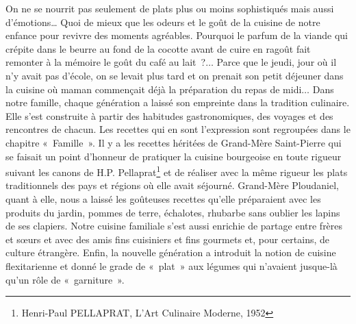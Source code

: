 On ne se nourrit pas seulement de plats plus ou moins sophistiqués mais aussi d'émotions… Quoi de mieux que les odeurs et le goût de la cuisine de notre enfance pour revivre des moments agréables. Pourquoi le parfum de la viande qui crépite dans le beurre au fond de la cocotte avant de cuire en ragoût fait remonter à la mémoire le goût du café au lait ?$\ldots$ Parce que le jeudi, jour où il n’y avait pas d’école, on se levait plus tard et on prenait son petit déjeuner dans la cuisine où maman commençait déjà la préparation du repas de midi$\ldots$
Dans notre famille, chaque génération a laissé son empreinte dans la tradition culinaire. Elle s’est construite à partir des habitudes gastronomiques, des voyages et des rencontres de chacun. Les recettes qui en sont l’expression sont regroupées dans le chapitre « Famille ». Il y a les recettes héritées de Grand-Mère Saint-Pierre qui se faisait un point d’honneur de pratiquer la cuisine bourgeoise en toute rigueur suivant les canons de H.P. Pellaprat\footnote{Henri-Paul PELLAPRAT, L’Art Culinaire Moderne, 1952} et de réaliser avec la même rigueur les plats traditionnels des pays et régions où elle avait séjourné. Grand-Mère Ploudaniel, quant à elle, nous a laissé les goûteuses recettes qu’elle préparaient avec les produits du jardin, pommes de terre, échalotes, rhubarbe sans oublier les lapins de ses clapiers. Notre cuisine familiale s’est aussi enrichie de partage entre frères et sœurs et avec des amis fins cuisiniers et fins gourmets et, pour certains, de culture étrangère. Enfin, la nouvelle génération a introduit la notion de cuisine flexitarienne et donné le grade de « plat » aux légumes qui n’avaient jusque-là qu’un rôle de « garniture ».

